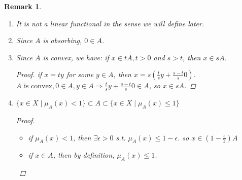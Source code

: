 \documentclass{article}
\newtheorem*{remark}{Remark}
\begin{document}
\begin{remark} \hfill
    \begin{enumerate}
        \item It is not a linear functional in the sense we will define later.
        \item Since $A$ is absorbing, $0 \in A$.
        \item Since $A$ is convex, we have: if $x \in tA, t > 0$ and $s>t$, then $x \in sA$.
        \begin{proof}
            if $x = ty$ for some $y \in A$, then $x=s(\frac{t}{s}y + \frac{s-t}{s}0)$. \(A \mbox{ is convex},
            0 \in A, y \in A \Rightarrow \frac{t}{s}y + \frac{s-t}{s}0 \in A\), so $x \in sA$.
        \end{proof}
        \item \(\{x \in X \mid \mu_{A}(x) < 1\} \subset A \subset \{x \in X \mid \mu_{A}(x) \le 1\}\)
        \begin{proof} \hfil
            \begin{itemize}
                \item if $\mu_A(x) < 1$, then $\exists \epsilon > 0$ s.t. $\mu_A(x) \le 1 - \epsilon$. so $x \in (1 - \frac{\epsilon}{2})A$
                \item if $x \in A$, then by definition, $\mu_A(x) \le 1$.
            \end{itemize}
        \end{proof}
    \end{enumerate}    
\end{remark}
\end{document}
